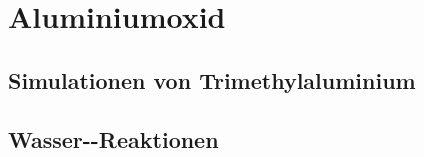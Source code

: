 \chapter{Aluminiumoxid}
\label{appendix_alumina}

\section{Simulationen von Trimethylaluminium}


\section{Wasser--Reaktionen}


